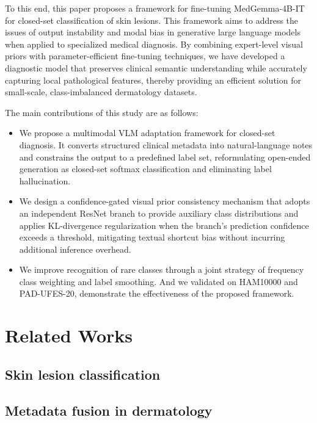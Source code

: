 \documentclass[preprint,12pt]{elsarticle}
\begin{document}
To this end, this paper proposes a framework for fine-tuning MedGemma-4B-IT\cite{sellergren2025medgemma} for closed-set classification of skin lesions. This framework aims to address the issues of output instability and modal bias in generative large language models when applied to specialized medical diagnosis. By combining expert-level visual priors with parameter-efficient fine-tuning techniques\cite{hu2022lora}, we have developed a diagnostic model that preserves clinical semantic understanding while accurately capturing local pathological features, thereby providing an efficient solution for small-scale, class-imbalanced dermatology datasets.


The main contributions of this study are as follows:
\begin{itemize}
	
	\item We propose a multimodal VLM adaptation framework for closed-set diagnosis. It converts structured clinical metadata into natural-language notes and constrains the output to a predefined label set, reformulating open-ended generation as closed-set softmax classification and eliminating label hallucination.
	
	
	
	\item We design a confidence-gated visual prior consistency mechanism that adopts an independent ResNet branch to provide auxiliary class distributions and applies KL-divergence regularization when the branch's prediction confidence exceeds a threshold, mitigating textual shortcut bias without incurring additional inference overhead.
	
	
	\item We improve recognition of rare classes through a joint strategy of frequency class weighting and label smoothing. And we validated on  HAM10000 and PAD-UFES-20\cite{tschandl2018ham10000,pacheco2020padufes20}, demonstrate the effectiveness of the proposed framework.
\end{itemize}


\section{Related Works}

\subsection{Skin lesion classification}
\subsection{Metadata fusion in dermatology}
\end{document}
